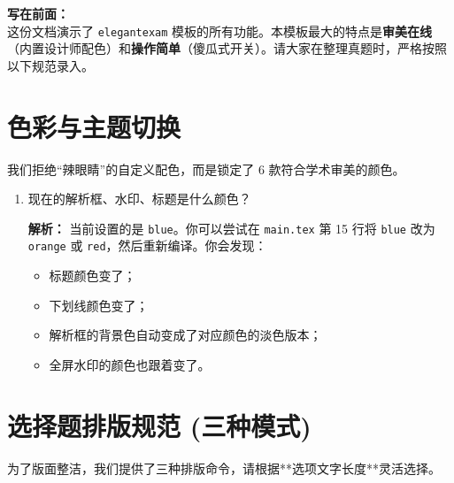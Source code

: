 \documentclass{elegantexam}
\begin{document}
\maketitle

\noindent\textbf{写在前面：} \\
这份文档演示了 \texttt{elegantexam} 模板的所有功能。本模板最大的特点是\textbf{审美在线}（内置设计师配色）和\textbf{操作简单}（傻瓜式开关）。请大家在整理真题时，严格按照以下规范录入。

\section{色彩与主题切换}

我们拒绝“辣眼睛”的自定义配色，而是锁定了 6 款符合学术审美的颜色。

\begin{enumerate}
    \item 现在的解析框、水印、标题是什么颜色？ \kh[A]
    
    \begin{solution}
        \textbf{解析：} 当前设置的是 \texttt{blue}。你可以尝试在 \texttt{main.tex} 第 15 行将 \texttt{blue} 改为 \texttt{orange} 或 \texttt{red}，然后重新编译。你会发现：
        \begin{itemize}
            \item 标题颜色变了；
            \item 下划线颜色变了；
            \item 解析框的背景色自动变成了对应颜色的淡色版本；
            \item 全屏水印的颜色也跟着变了。
        \end{itemize}
    \end{solution}
\end{enumerate}

\section{选择题排版规范 (三种模式)}

为了版面整洁，我们提供了三种排版命令，请根据**选项文字长度**灵活选择。
\end{document}
